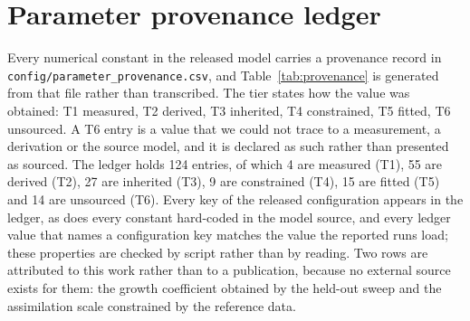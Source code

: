 \appendix

\section{Parameter provenance ledger}
\label{app:params}

Every numerical constant in the released model carries a provenance record in
\texttt{config/parameter\_provenance.csv}, and Table~\ref{tab:provenance} is
generated from that file rather than transcribed. The tier states how the value
was obtained: T1 measured, T2 derived, T3 inherited, T4 constrained, T5 fitted, T6 unsourced. A T6 entry is a value that
we could not trace to a measurement, a derivation or the source model, and it is
declared as such rather than presented as sourced. The ledger holds 124 entries, of which 4 are measured (T1), 55 are derived (T2), 27 are inherited (T3), 9 are constrained (T4), 15 are fitted (T5) and 14 are unsourced (T6). Every key of the released configuration appears in the ledger, as does every constant hard-coded in the model source, and every ledger value that names a configuration key matches the value the reported runs load; these properties are checked by script rather than by reading. Two rows are attributed to this work rather than to a publication, because no external source exists for them: the growth coefficient obtained by the held-out sweep and the assimilation scale constrained by the reference data.

